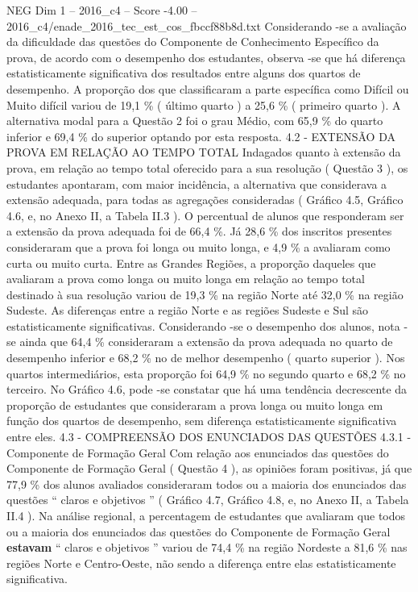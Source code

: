 \begin{textsample}{NEG Dim 1 – 2016\_c4 – Score -4.00 – 2016\_c4/enade\_2016\_tec\_est\_cos\_fbccf88b8d.txt}
Considerando -se a avaliação da dificuldade das questões do Componente de Conhecimento Específico da prova, de acordo com o desempenho dos estudantes, observa -se que há diferença estatisticamente significativa dos resultados entre alguns dos quartos de desempenho.
A proporção dos que classificaram a parte específica como Difícil ou Muito difícil variou de 19,1 \% ( último quarto ) a 25,6 \% ( primeiro quarto ).
A alternativa modal para a Questão 2 foi o grau Médio, com 65,9 \% do quarto inferior e 69,4 \% do superior optando por esta resposta. 4.2 - EXTENSÃO DA PROVA EM RELAÇÃO AO TEMPO TOTAL Indagados quanto à extensão da prova, em relação ao tempo total oferecido para a sua resolução ( Questão 3 ), os estudantes apontaram, com maior incidência, a alternativa que considerava a extensão adequada, para todas as agregações consideradas ( Gráfico 4.5, Gráfico 4.6, e, no Anexo II, a Tabela II.3 ).
O percentual de alunos que responderam ser a extensão da prova adequada foi de 66,4 \%.
Já 28,6 \% dos inscritos presentes consideraram que a prova foi longa ou muito longa, e 4,9 \% a avaliaram como curta ou muito curta.
Entre as Grandes Regiões, a proporção daqueles que avaliaram a prova como longa ou muito longa em relação ao tempo total destinado à sua resolução variou de 19,3 \% na região Norte até 32,0 \% na região Sudeste.
As diferenças entre a região Norte e as regiões Sudeste e Sul são estatisticamente significativas.
Considerando -se o desempenho dos alunos, nota -se ainda que 64,4 \% consideraram a extensão da prova adequada no quarto de desempenho inferior e 68,2 \% no de melhor desempenho ( quarto superior ).
Nos quartos intermediários, esta proporção foi 64,9 \% no segundo quarto e 68,2 \% no terceiro.
No Gráfico 4.6, pode -se constatar que há uma tendência decrescente da proporção de estudantes que consideraram a prova longa ou muito longa em função dos quartos de desempenho, sem diferença estatisticamente significativa entre eles. 4.3 - COMPREENSÃO DOS ENUNCIADOS DAS QUESTÕES 4.3.1 - Componente de Formação Geral Com relação aos enunciados das questões do Componente de Formação Geral ( Questão 4 ), as opiniões foram positivas, já que 77,9 \% dos alunos avaliados consideraram todos ou a maioria dos enunciados das questões “ claros e objetivos ” ( Gráfico 4.7, Gráfico 4.8, e, no Anexo II, a Tabela II.4 ).
Na análise regional, a percentagem de estudantes que avaliaram que todos ou a maioria dos enunciados das questões do Componente de Formação Geral \textbf{estavam} “ claros e objetivos ” variou de 74,4 \% na região Nordeste a 81,6 \% nas regiões Norte e Centro-Oeste, não sendo a diferença entre elas estatisticamente significativa.

\end{textsample}
